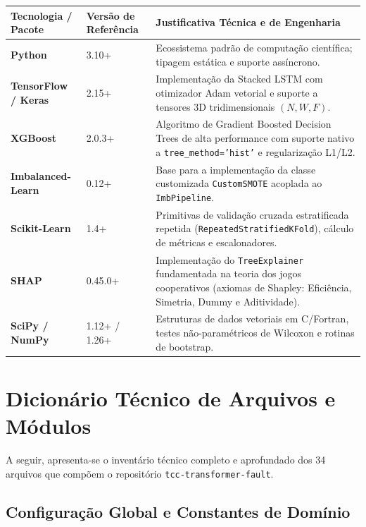 \documentclass[10pt,a4paper]{article}
\begin{document}
\begin{table}[H]
\centering
\small
\begin{tabularx}{\textwidth}{p{3.0cm} p{3.2cm} X}
\toprule
\textbf{Tecnologia / Pacote} & \textbf{Versão de Referência} & \textbf{Justificativa Técnica e de Engenharia} \\
\midrule
\textbf{Python} & 3.10+ & Ecossistema padrão de computação científica; tipagem estática e suporte assíncrono. \\
\textbf{TensorFlow / Keras} & 2.15+ & Implementação da Stacked LSTM com otimizador Adam vetorial e suporte a tensores 3D tridimensionais $(N, W, F)$. \\
\textbf{XGBoost} & 2.0.3+ & Algoritmo de Gradient Boosted Decision Trees de alta performance com suporte nativo a \texttt{tree\_method='hist'} e regularização L1/L2. \\
\textbf{Imbalanced-Learn} & 0.12+ & Base para a implementação da classe customizada \texttt{CustomSMOTE} acoplada ao \texttt{ImbPipeline}. \\
\textbf{Scikit-Learn} & 1.4+ & Primitivas de validação cruzada estratificada repetida (\texttt{RepeatedStratifiedKFold}), cálculo de métricas e escalonadores. \\
\textbf{SHAP} & 0.45.0+ & Implementação do \texttt{TreeExplainer} fundamentada na teoria dos jogos cooperativos (axiomas de Shapley: Eficiência, Simetria, Dummy e Aditividade). \\
\textbf{SciPy / NumPy} & 1.12+ / 1.26+ & Estruturas de dados vetoriais em C/Fortran, testes não-paramétricos de Wilcoxon e rotinas de bootstrap. \\
\bottomrule
\end{tabularx}
\end{table}

\newpage
\section{Dicionário Técnico de Arquivos e Módulos}

A seguir, apresenta-se o inventário técnico completo e aprofundado dos 34 arquivos que compõem o repositório \texttt{tcc-transformer-fault}.

\subsection{Configuração Global e Constantes de Domínio}
\end{document}
